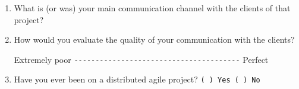 \documentclass[lnbip]{svmultln}
\begin{document}
\begin{enumerate}
\item What is (or was) your main communication channel with the
  clients of that project?
  \vspace{10pt}

\item How would you evaluate the quality of your communication with
  the clients?

  Extremely poor \verb=---------------------------------------=
  Perfect \vspace{10pt}

\item Have you ever been on a distributed agile project?
  \verb=( ) Yes ( ) No= \vspace{10pt}


\end{enumerate}
\end{document}
